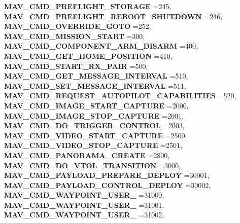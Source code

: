 \begin{DoxyCompactItemize}
\newline
\textbf{ M\+A\+V\+\_\+\+C\+M\+D\+\_\+\+P\+R\+E\+F\+L\+I\+G\+H\+T\+\_\+\+S\+T\+O\+R\+A\+GE} =245, 
\textbf{ M\+A\+V\+\_\+\+C\+M\+D\+\_\+\+P\+R\+E\+F\+L\+I\+G\+H\+T\+\_\+\+R\+E\+B\+O\+O\+T\+\_\+\+S\+H\+U\+T\+D\+O\+WN} =246, 
\textbf{ M\+A\+V\+\_\+\+C\+M\+D\+\_\+\+O\+V\+E\+R\+R\+I\+D\+E\+\_\+\+G\+O\+TO} =252, 
\textbf{ M\+A\+V\+\_\+\+C\+M\+D\+\_\+\+M\+I\+S\+S\+I\+O\+N\+\_\+\+S\+T\+A\+RT} =300, 
\newline
\textbf{ M\+A\+V\+\_\+\+C\+M\+D\+\_\+\+C\+O\+M\+P\+O\+N\+E\+N\+T\+\_\+\+A\+R\+M\+\_\+\+D\+I\+S\+A\+RM} =400, 
\textbf{ M\+A\+V\+\_\+\+C\+M\+D\+\_\+\+G\+E\+T\+\_\+\+H\+O\+M\+E\+\_\+\+P\+O\+S\+I\+T\+I\+ON} =410, 
\textbf{ M\+A\+V\+\_\+\+C\+M\+D\+\_\+\+S\+T\+A\+R\+T\+\_\+\+R\+X\+\_\+\+P\+A\+IR} =500, 
\textbf{ M\+A\+V\+\_\+\+C\+M\+D\+\_\+\+G\+E\+T\+\_\+\+M\+E\+S\+S\+A\+G\+E\+\_\+\+I\+N\+T\+E\+R\+V\+AL} =510, 
\newline
\textbf{ M\+A\+V\+\_\+\+C\+M\+D\+\_\+\+S\+E\+T\+\_\+\+M\+E\+S\+S\+A\+G\+E\+\_\+\+I\+N\+T\+E\+R\+V\+AL} =511, 
\textbf{ M\+A\+V\+\_\+\+C\+M\+D\+\_\+\+R\+E\+Q\+U\+E\+S\+T\+\_\+\+A\+U\+T\+O\+P\+I\+L\+O\+T\+\_\+\+C\+A\+P\+A\+B\+I\+L\+I\+T\+I\+ES} =520, 
\textbf{ M\+A\+V\+\_\+\+C\+M\+D\+\_\+\+I\+M\+A\+G\+E\+\_\+\+S\+T\+A\+R\+T\+\_\+\+C\+A\+P\+T\+U\+RE} =2000, 
\textbf{ M\+A\+V\+\_\+\+C\+M\+D\+\_\+\+I\+M\+A\+G\+E\+\_\+\+S\+T\+O\+P\+\_\+\+C\+A\+P\+T\+U\+RE} =2001, 
\newline
\textbf{ M\+A\+V\+\_\+\+C\+M\+D\+\_\+\+D\+O\+\_\+\+T\+R\+I\+G\+G\+E\+R\+\_\+\+C\+O\+N\+T\+R\+OL} =2003, 
\textbf{ M\+A\+V\+\_\+\+C\+M\+D\+\_\+\+V\+I\+D\+E\+O\+\_\+\+S\+T\+A\+R\+T\+\_\+\+C\+A\+P\+T\+U\+RE} =2500, 
\textbf{ M\+A\+V\+\_\+\+C\+M\+D\+\_\+\+V\+I\+D\+E\+O\+\_\+\+S\+T\+O\+P\+\_\+\+C\+A\+P\+T\+U\+RE} =2501, 
\textbf{ M\+A\+V\+\_\+\+C\+M\+D\+\_\+\+P\+A\+N\+O\+R\+A\+M\+A\+\_\+\+C\+R\+E\+A\+TE} =2800, 
\newline
\textbf{ M\+A\+V\+\_\+\+C\+M\+D\+\_\+\+D\+O\+\_\+\+V\+T\+O\+L\+\_\+\+T\+R\+A\+N\+S\+I\+T\+I\+ON} =3000, 
\textbf{ M\+A\+V\+\_\+\+C\+M\+D\+\_\+\+P\+A\+Y\+L\+O\+A\+D\+\_\+\+P\+R\+E\+P\+A\+R\+E\+\_\+\+D\+E\+P\+L\+OY} =30001, 
\textbf{ M\+A\+V\+\_\+\+C\+M\+D\+\_\+\+P\+A\+Y\+L\+O\+A\+D\+\_\+\+C\+O\+N\+T\+R\+O\+L\+\_\+\+D\+E\+P\+L\+OY} =30002, 
\textbf{ M\+A\+V\+\_\+\+C\+M\+D\+\_\+\+W\+A\+Y\+P\+O\+I\+N\+T\+\_\+\+U\+S\+E\+R\+\_} =31000, 
\newline
\textbf{ M\+A\+V\+\_\+\+C\+M\+D\+\_\+\+W\+A\+Y\+P\+O\+I\+N\+T\+\_\+\+U\+S\+E\+R\+\_} =31001, 
\textbf{ M\+A\+V\+\_\+\+C\+M\+D\+\_\+\+W\+A\+Y\+P\+O\+I\+N\+T\+\_\+\+U\+S\+E\+R\+\_} =31002, 

\end{DoxyCompactItemize}
